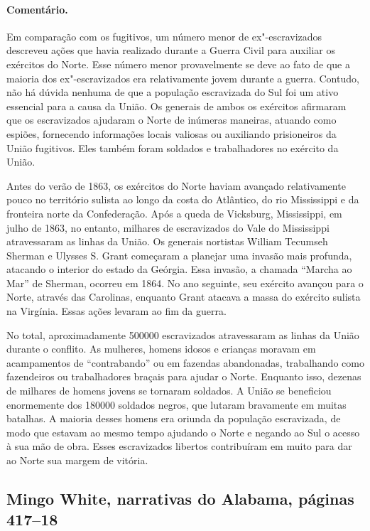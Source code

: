 \paragraph{Comentário.}\quad
{\small
Em comparação com os fugitivos, um número menor de ex"-escravizados
descreveu ações que havia realizado durante a Guerra Civil para auxiliar
os exércitos do Norte. Esse número menor provavelmente se deve ao fato
de que a maioria dos ex"-escravizados era relativamente jovem durante a
guerra. Contudo, não há dúvida nenhuma de que a população escravizada do Sul
foi um ativo essencial para a causa da União. Os generais de ambos os
exércitos afirmaram que os escravizados ajudaram o Norte de inúmeras
maneiras, atuando como espiões, fornecendo informações locais valiosas
ou auxiliando prisioneiros da União fugitivos. Eles também foram
soldados e trabalhadores no exército da União.

Antes do verão de 1863, os exércitos do Norte haviam avançado
relativamente pouco no território sulista ao longo da costa do
Atlântico, do rio Mississippi e da fronteira norte da Confederação. Após %
a queda de Vicksburg, Mississippi, em julho de 1863, no entanto, %
milhares de escravizados do Vale do Mississippi atravessaram as linhas da %
União. Os generais nortistas William Tecumseh Sherman e Ulysses S. Grant
começaram a planejar uma invasão mais profunda, atacando o interior do
estado da Geórgia. Essa invasão, a chamada ``Marcha ao Mar'' de Sherman,
ocorreu em 1864. No ano seguinte, seu exército avançou para o Norte,
através das Carolinas, enquanto Grant atacava a massa do exército
sulista na Virgínia. Essas ações levaram ao fim da guerra.

No total, aproximadamente 500000 escravizados atravessaram as linhas
da União durante o conflito. As mulheres, homens idosos e crianças
moravam em acampamentos de ``contrabando'' ou em fazendas abandonadas,
trabalhando como fazendeiros ou trabalhadores braçais para ajudar o
Norte. Enquanto isso, dezenas de milhares de homens jovens se tornaram
soldados. A União se beneficiou enormemente dos 180000 soldados negros,
que lutaram bravamente em muitas batalhas. A maioria desses homens era
oriunda da população escravizada, de modo que estavam ao mesmo tempo
ajudando o Norte e negando ao Sul o acesso à sua mão de obra. Esses
escravizados libertos contribuíram em muito para dar ao Norte sua margem de
vitória.
}

\subsection{Mingo White, narrativas do Alabama, páginas 417--18}
\label{ref288}

